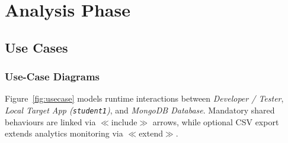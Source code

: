 \documentclass[11pt,a4paper]{report}
\begin{document}
\chapter{Analysis Phase}

\section{Use Cases}

\subsection{Use-Case Diagrams}

Figure~\ref{fig:usecase} models runtime interactions between \textit{Developer / Tester}, \textit{Local Target App (\texttt{student1})}, and \textit{MongoDB Database}. Mandatory shared behaviours are linked via $\ll$include$\gg$ arrows, while optional CSV export extends analytics monitoring via $\ll$extend$\gg$.
\end{document}
